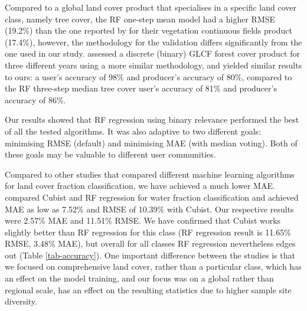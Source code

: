 \documentclass[review,authoryear,3p]{elsarticle}
\begin{document}

Compared to a global land cover product that specialises in a specific land cover class, namely tree cover, the \gls{RF} one-step mean model had a higher RMSE (19.2\%) than the one reported by \citet{sexton_global_2013} for their vegetation continuous fields product (17.4\%), however, the methodology for the validation differs significantly from the one used in our study.
\citet{feng_earth_2016} assessed a discrete (binary) GLCF forest cover product for three different years using a more similar methodology, and yielded similar results to ours: a user's accuracy of 98\% and producer's accuracy of 80\%, compared to the \gls{RF} three-step median tree cover user's accuracy of 81\% and producer's accuracy of 86\%.

Our results showed that \gls{RF} regression using binary relevance performed the best of all the tested algorithms.
It was also adaptive to two different goals: minimising \gls{RMSE} (default) and minimising \gls{MAE} (with median voting).
Both of these goals may be valuable to different user communities.%

Compared to other studies that compared different machine learning algorithms for land cover fraction classification, we have achieved a much lower \gls{MAE}.
\citet{li_monitoring_2018} compared Cubist and \gls{RF} regression for water fraction classification and achieved \gls{MAE} as low as 7.52\% and \gls{RMSE} of 10.39\% with Cubist.
Our respective results were 2.57\% \gls{MAE} and 11.51\% RMSE.
We have confirmed that Cubist works slightly better than \gls{RF} regression for this class (\gls{RF} regression result is 11.65\% \gls{RMSE}, 3.48\% \gls{MAE}), but overall for all classes \gls{RF} regression nevertheless edges out (Table \ref{tab-accuracy}).
One important difference between the studies is that we focused on comprehensive land cover, rather than a particular class, which has an effect on the model training, and our focus was on a global rather than regional scale, has an effect on the resulting statistics due to higher sample site diversity.
\end{document}
